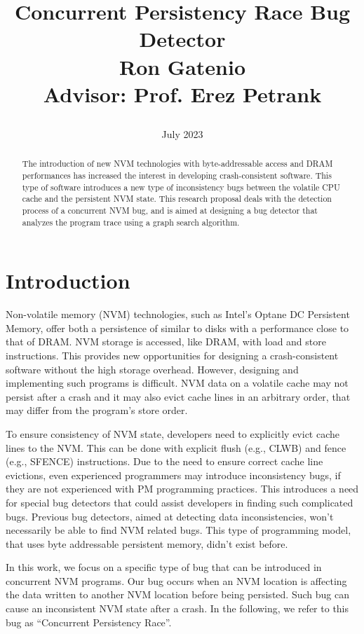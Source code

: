 \documentclass[a4paper,12pt]{article}
\title{Concurrent Persistency Race Bug Detector\\
\large{Ron Gatenio\\Advisor: Prof. Erez Petrank}
\date{July 2023}
}
\begin{document}
\maketitle
\begin{abstract}
The introduction of new NVM technologies with byte-addressable access and DRAM performances has increased the interest in developing crash-consistent software.
This type of software introduces a new type of inconsistency bugs between the volatile CPU cache and the persistent NVM state.
This research proposal deals with the detection process of a concurrent NVM bug, and is aimed at designing a bug detector that analyzes the program trace using a graph search algorithm.
\end{abstract}



\section{Introduction}
Non-volatile memory (NVM) technologies, such as Intel’s Optane DC Persistent Memory, offer both a persistence of similar to disks with a performance close to that of DRAM. NVM storage is accessed, like DRAM, with load and store instructions. This provides new opportunities for designing a crash-consistent software without the high storage overhead. However, designing and implementing such programs is difficult. NVM data on a volatile cache may not persist after a crash and it may also evict cache lines in an arbitrary order, that may differ from the program’s store order.

To ensure consistency of NVM state, developers need to explicitly evict cache lines to the NVM. This can be done with explicit flush (e.g., CLWB) and fence (e.g., SFENCE) instructions. Due to the need to ensure correct cache line evictions, even experienced programmers may introduce inconsistency bugs, if they are not experienced with PM programming practices. This introduces a need for special bug detectors that could assist developers in finding such complicated bugs. Previous bug detectors, aimed at detecting data inconsistencies, won’t necessarily be able to find NVM related bugs. This type of programming model, that uses byte addressable persistent memory, didn’t exist before. 

In this work, we focus on a specific type of bug that can be introduced in concurrent NVM programs. Our bug occurs when an NVM location is affecting the data written to another NVM location before being persisted. Such bug can cause an inconsistent NVM state after a crash. In the following, we refer to this bug as “Concurrent Persistency Race”.
\end{document}
